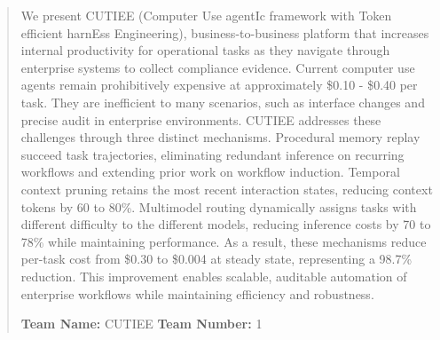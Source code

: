 \documentclass{article}
\theoremstyle{plain}
\theoremstyle{definition}
\theoremstyle{remark}
\begin{document}


\begin{abstract}
We present CUTIEE (Computer Use agentIc framework with Token efficient harnEss Engineering), business-to-business platform that increases internal productivity for operational tasks as they navigate through enterprise systems to collect compliance evidence. Current computer use agents remain prohibitively expensive at approximately \$0.10 - \$0.40 per task. They are inefficient to many scenarios, such as interface changes and precise audit in enterprise environments. CUTIEE addresses these challenges through three distinct mechanisms. Procedural memory replay succeed task trajectories, eliminating redundant inference on recurring workflows and extending prior work on workflow induction. Temporal context pruning retains the most recent interaction states, reducing context tokens by 60 to 80\%. Multimodel routing dynamically assigns tasks with different difficulty to the different models, reducing inference costs by 70 to 78\% while maintaining performance. As a result, these mechanisms reduce per-task cost from \$0.30 to \$0.004 at steady state, representing a 98.7\% reduction. This improvement enables scalable, auditable automation of enterprise workflows while maintaining efficiency and robustness.

\textbf{Team Name:} CUTIEE \quad \textbf{Team Number:} 1
\end{abstract}
\end{document}
